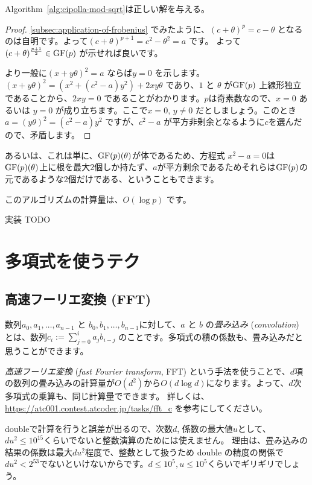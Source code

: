 \documentclass{jsarticle}
\begin{document}
  \begin{proposition}
   Algorithm~\ref{alg:cipolla-mod-sqrt}は正しい解を与える。
  \end{proposition}
  \begin{proof}
   \ref{subsec:application-of-frobenius} でみたように、$(c+\theta)^{p} = c - \theta$ となるのは自明です。よって$(c+\theta)^{p+1} = c^2-\theta^2 = a$ です。
   よって$(c+\theta)^{\frac{p+1}2} \in \mathrm{GF}(p)$ が示せれば良いです。

   より一般に$(x+y\theta)^2 = a$ ならば$y = 0$ を示します。
   $(x+y\theta)^2 = (x^2+(c^2-a)y^2) + 2xy\theta$ であり、$1$ と $\theta$ が$\mathrm{GF}(p)$ 上線形独立であることから、$2xy = 0$ であることがわかります。$p$は奇素数なので、$x=0$ あるいは $y=0$ が成り立ちます。ここで$x = 0$, $y \neq 0$ だとしましょう。このとき$a = (y\theta)^2 = (c^2-a)y^2$ ですが、$c^2-a$ が平方非剰余となるように$c$を選んだので、矛盾します。
  \end{proof}
  \begin{remark}
   あるいは、これは単に、$\mathrm{GF}(p)(\theta)$が体であるため、方程式 $x^2-a = 0$は$\mathrm{GF}(p)(\theta)$上に根を最大2個しか持たず、$a$が平方剰余であるためそれらは$\mathrm{GF}(p)$の元であるような2個だけである、ということもできます。
  \end{remark}
  このアルゴリズムの計算量は、$O(\log p)$ です。

  実装 TODO
 \section{多項式を使うテク~}
 \label{sec:technique-using-polynomials}
  \subsection{高速フーリエ変換 (FFT)~}
  \label{subsec:fft}
  数列$a_0, a_1, \ldots, a_{n-1}$ と $b_0, b_1, \ldots, b_{n-1}$に対して、$a$ と $b$ の\emph{畳み込み} (\emph{convolution}) とは、数列$c_i := \sum_{j=0}^{i} a_jb_{i-j}$ のことです。多項式の積の係数も、畳み込みだと思うことができます。

  \emph{高速フーリエ変換} (\emph{fast Fourier transform}, FFT) という手法を使うことで、$d$項の数列の畳み込みの計算量が$O(d^2)$から$O(d \log d)$になります。よって、$d$次多項式の乗算も、同じ計算量でできます。
  詳しくは、\url{https://atc001.contest.atcoder.jp/tasks/fft_c} を参考にしてください。

  doubleで計算を行うと誤差が出るので、次数$d$, 係数の最大値$u$として、$du^2 \le 10^{15}$くらいでないと整数演算のためには使えません。
  理由は、畳み込みの結果の係数は最大$du^2$程度で、整数として扱うため double の精度の関係で $du^2 < 2^{53}$でないといけないからです。$d \le 10^5, u\le 10^5$くらいでギリギリでしょう。
\end{document}
